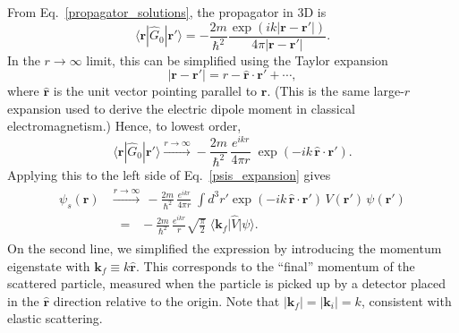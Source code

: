 \documentclass[pra,12pt]{revtex4-2}
\begin{document}
From Eq.~\eqref{propagator_solutions}, the propagator in 3D is
\begin{equation}
  \langle\mathbf{r}|\hat{G}_0|\mathbf{r}'\rangle =
  - \frac{2m}{\hbar^2}
  \frac{\exp\left(ik|\mathbf{r}-\mathbf{r}'|\right)}{4\pi|\mathbf{r}-\mathbf{r}'|}.
\end{equation}
In the $r\rightarrow\infty$ limit, this can be simplified using the
Taylor expansion
\begin{equation}
  |\mathbf{r} - \mathbf{r}'| = r - \hat{\mathbf{r}} \cdot \mathbf{r}' + \cdots,
\end{equation}
where $\hat{\mathbf{r}}$ is the unit vector pointing parallel to
$\mathbf{r}$.  (This is the same large-$r$ expansion used to derive
the electric dipole moment in classical electromagnetism.)  Hence, to
lowest order,
\begin{equation}
  \langle\mathbf{r}|\hat{G}_0|\mathbf{r}'\rangle \overset{r\rightarrow\infty}{\longrightarrow} - \frac{2m}{\hbar^2}\, \frac{e^{ikr}}{4\pi r}\; \exp\left(-ik \, \hat{\mathbf{r}} \cdot \mathbf{r}'\right).
\end{equation}
Applying this to the left side of Eq.~\eqref{psis_expansion} gives
\begin{align}
  \begin{aligned}\psi_s(\mathbf{r})
    &\overset{r\rightarrow\infty}{\longrightarrow} \, - \frac{2m}{\hbar^2} \, \frac{e^{ikr}}{4\pi r}\; \int d^3r' \exp\left(-ik \, \hat{\mathbf{r}} \cdot \mathbf{r}'\right)\, V(\mathbf{r}')\, \psi(\mathbf{r}') \\
    &\;\;=\;\; - \frac{2m}{\hbar^2} \, \frac{e^{ikr}}{r} \sqrt{\frac{\pi}{2}} \; \big\langle \mathbf{k}_f \big|\hat{V}\big|\psi\big\rangle. \end{aligned}
\end{align}
On the second line, we simplified the expression by introducing the
momentum eigenstate with $\mathbf{k}_f \equiv k \hat{\mathbf{r}}$.
This corresponds to the ``final'' momentum of the scattered particle,
measured when the particle is picked up by a detector placed in the
$\hat{\mathbf{r}}$ direction relative to the origin.  Note that
$|\mathbf{k}_f| = |\mathbf{k}_i| = k$, consistent with elastic
scattering.
\end{document}
